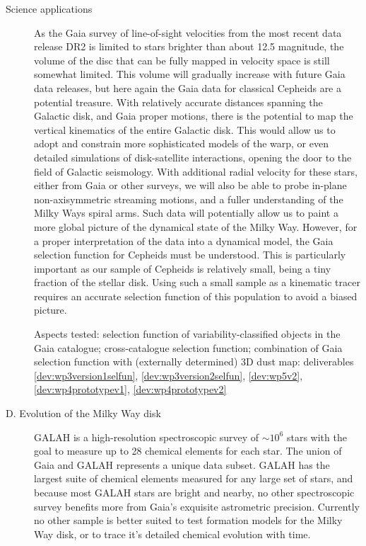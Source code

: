 \begin{workpackage}{Science applications}
\begin{wpobjectives}
\begin{description}
{        As the Gaia survey of line-of-sight velocities from the most recent data release DR2 is limited to stars brighter than about 12.5 magnitude, the volume of the disc that can be fully mapped in velocity space is still somewhat limited. This volume will gradually increase with future Gaia data releases, but here again the Gaia data for classical Cepheids are a potential treasure. With relatively accurate distances spanning the Galactic disk, and Gaia proper motions, there is the potential to map the vertical kinematics of the entire Galactic disk. This would allow us to adopt and constrain more sophisticated models of the warp, or even detailed simulations of disk-satellite interactions, opening the door to the field of Galactic seismology. With additional radial velocity for these stars, either from Gaia or other surveys, we will also be able to probe in-plane non-axisymmetric streaming motions, and a fuller understanding of the Milky Ways spiral arms. Such data will potentially allow us to paint a more global picture of the dynamical state of the Milky Way. However, for a proper interpretation of the data into a dynamical model, the Gaia selection function for Cepheids must be understood. This is particularly important as our sample of Cepheids is relatively small, being a tiny fraction of the stellar disk. Using such a small sample as a kinematic tracer requires an accurate selection function of this population to avoid a biased picture. 
        
        \textsf{Aspects tested: selection function of variability-classified objects in the Gaia catalogue; cross-catalogue selection function; combination of Gaia selection function with (externally determined) 3D dust map: deliverables \ref{dev:wp3version1selfun}, \ref{dev:wp3version2selfun}, \ref{dev:wp5v2}, \ref{dev:wp4prototypev1}, \ref{dev:wp4prototypev2}}
     }
     
     \item[D. Evolution of the Milky Way disk]
        {GALAH is a high-resolution spectroscopic survey of $\sim10^6$ stars with the goal to measure up to 28 chemical elements for each star. The union of Gaia and GALAH represents a unique data subset. GALAH has the largest suite of chemical elements measured for any large set of stars, and because most GALAH stars are bright and nearby, no other spectroscopic survey benefits more from Gaia's exquisite astrometric precision. Currently no other sample is better suited to test formation models for the Milky Way disk, or to trace it's detailed chemical evolution with time.
      
}
\end{description}
\end{wpobjectives}
\end{workpackage}
